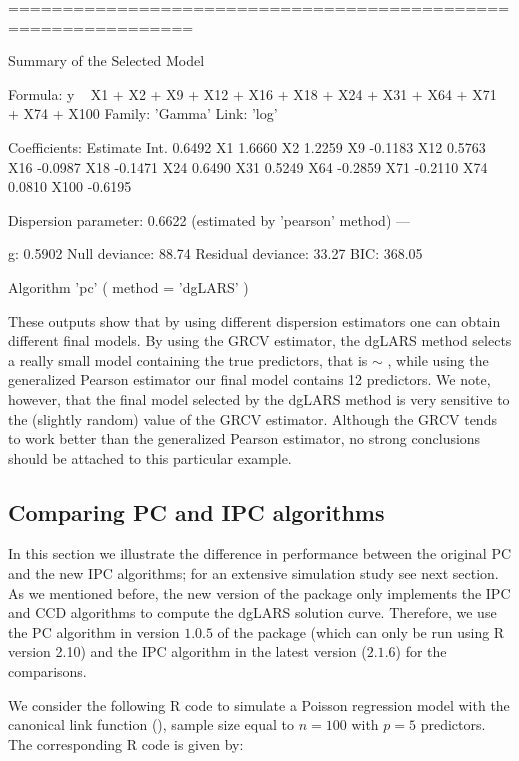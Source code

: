 \begin{example}
===============================================================

Summary of the Selected Model

    Formula: y ~ X1 + X2 + X9 + X12 + X16 + X18 + X24 + X31 + X64 + X71 + 
    X74 + X100
     Family: 'Gamma'
       Link: 'log'

Coefficients:
     Estimate
Int.   0.6492
X1     1.6660
X2     1.2259
X9    -0.1183
X12    0.5763
X16   -0.0987
X18   -0.1471
X24    0.6490
X31    0.5249
X64   -0.2859
X71   -0.2110
X74    0.0810
X100  -0.6195

Dispersion parameter: 0.6622 (estimated by 'pearson' method)
---

                 g: 0.5902
     Null deviance:  88.74 
 Residual deviance:  33.27 
               BIC: 368.05 

 Algorithm 'pc' ( method = 'dgLARS' )
\end{example}

These outputs show that by using different dispersion estimators one can obtain different final models. By using the GRCV estimator, the dgLARS method selects a really small model containing the true predictors, that is  $\sim$ , while using the generalized Pearson estimator our final model contains 12 predictors. We note, however, that the final model selected by the dgLARS method is very sensitive to the (slightly random) value of the GRCV estimator. Although the GRCV tends to work better than the generalized Pearson estimator, no strong conclusions should be attached to this particular example.  

\subsection[Comparing PC and IPC algorithms]{Comparing PC and IPC algorithms}
\label{subsec:pcandipc}

In this section we illustrate the difference in performance between the original PC and the new IPC algorithms; for an extensive simulation study see next section. As we mentioned before, the new version of the  package only implements the IPC and CCD algorithms to compute the dgLARS solution curve. Therefore, we use the PC algorithm  in version $1.0.5$ of the package (which can only be run using {R} version 2.10) and the IPC algorithm in the latest version ($2.1.6$) for the comparisons.

We consider the following {R} code to  simulate a Poisson regression model with the canonical link function (), sample size equal to $n=100$ with $p=5$ predictors. The corresponding {R} code is given by:

